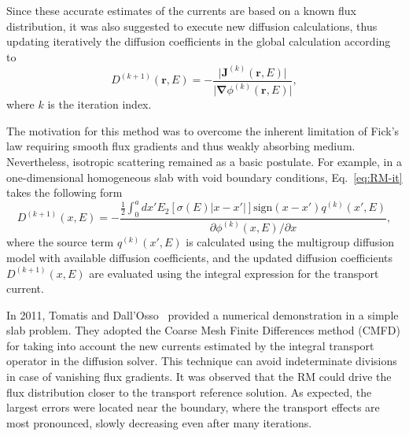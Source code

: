 \documentclass[letterpaper]{physor2020}
\newcommand{\rr}{\ensuremath{\bm{r}}}
\newcommand{\bnabla}{\ensuremath{\bm{\nabla}}}
\newcommand{\rE}{\ensuremath{(\rr,E)}}
\newcommand{\rr}{\ensuremath{\bm{r}}}
\newcommand{\bnabla}{\ensuremath{\bm{\nabla}}}
\newcommand{\rE}{\ensuremath{(\rr,E)}}
\begin{document}
Since these accurate estimates of the currents are based on a known flux distribution, it was also suggested to execute new diffusion calculations, thus updating iteratively the diffusion coefficients in the global calculation according to
\begin{equation}\label{eq:RM-it}
D^{(k+1)}\rE = - \frac{\lvert \bm{J}^{(k)}\rE\rvert}{\lvert\bnabla\phi^{(k)}\rE\rvert},
\end{equation}
where $k$ is the iteration index. %

The motivation for this method was to overcome the inherent limitation of Fick's law requiring smooth flux gradients and thus weakly absorbing medium. Nevertheless, isotropic scattering remained as a basic postulate. For example, in a one-dimensional homogeneous slab with void boundary conditions, Eq.~\eqref{eq:RM-it} takes the following form~\cite{Ronen-2004}
\begin{equation}\label{eq:RM-it-1D-slab}
D^{(k+1)}(x,E) = -\frac{\frac{1}{2}\int_0^a dx' E_2[\sigma(E)\lvert
	x-x'\rvert]\text{sign}(x-x')q^{(k)}(x',E)}
{\partial \phi^{(k)}(x,E)/\partial x},
\end{equation}
where the source term $q^{(k)}(x',E)$ is calculated using the multigroup diffusion model with available diffusion coefficients, and the updated diffusion coefficients $D^{(k+1)}(x,E)$ are evaluated using the integral expression for the transport current. 

In 2011, Tomatis and Dall'Osso~\cite{Tomatis-2011} provided a numerical demonstration in a simple slab problem. They adopted the Coarse Mesh Finite Differences method (CMFD) for taking into account the new currents estimated by the integral transport operator in the diffusion solver.
%
%
This technique can avoid indeterminate divisions in case of vanishing flux gradients. It was observed that the RM could drive the flux distribution closer to the transport reference solution. As expected, the largest errors were located near the boundary, where the transport effects are most pronounced, slowly decreasing even after many iterations.%


\end{document}

